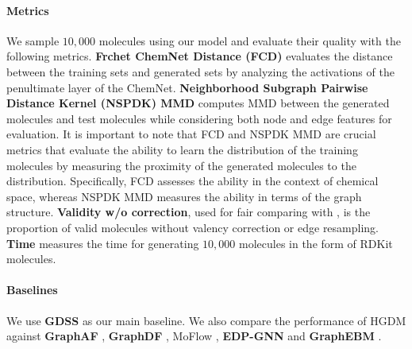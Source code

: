 \documentclass[letterpaper]{article} %
\begin{document}
\paragraph{Metrics}
We sample $10,000$ molecules using our model and evaluate their quality with the following metrics. \textbf{Frchet ChemNet Distance (FCD)} \cite{preuer2018frechet} evaluates the distance between the training sets and generated sets by analyzing the activations of the penultimate layer of the ChemNet. \textbf{Neighborhood Subgraph Pairwise Distance Kernel (NSPDK) MMD} \cite{costa2010fast} computes MMD between the generated molecules and test molecules while considering both node and edge features for evaluation. It is important to note that FCD and NSPDK MMD are crucial metrics that evaluate the ability to learn the distribution of the training molecules by measuring the proximity of the generated molecules to the distribution. Specifically, FCD assesses the ability in the context of chemical space, whereas NSPDK MMD measures the ability in terms of the graph structure. \textbf{Validity w/o correction},  used for fair comparing with \cite{jo2022score}, is the proportion of valid molecules without valency correction or edge resampling. \textbf{Time} measures the time for generating $10,000$ molecules in the form of RDKit molecules.



\paragraph{Baselines}
We use \textbf{GDSS} \cite{jo2022score} as our main baseline. We also compare the performance of HGDM against \textbf{GraphAF} \cite{shi2020graphaf}, \textbf{GraphDF} \cite{luo2021graphdf}, MoF\textbf{}low \cite{zang2020moflow}, \textbf{EDP-GNN} \cite{niu2020permutation} and \textbf{GraphEBM} \cite{liu2021graphebm}.
\begin{table}
\Huge
\centering
{}
\caption{Generation results of the variants of GDSS and HGDM on the QM9 dataset.}
\label{Ablation}
\end{table}
\end{document}

